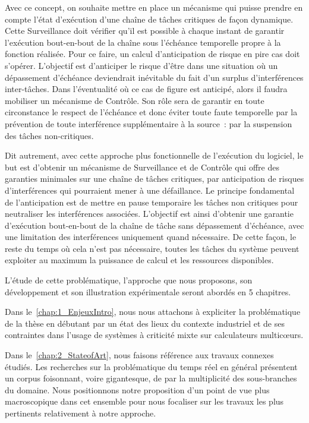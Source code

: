 \documentclass[french, a4paper, 11pt, twoside, pdftex]{StyleThese}
\begin{document}
Avec ce concept, on souhaite mettre en place un mécanisme qui puisse prendre en compte l'état d'exécution d'une chaîne de tâches critiques de façon dynamique. Cette Surveillance doit vérifier qu'il est possible à chaque instant de garantir l'exécution bout-en-bout de la chaîne sous l'échéance temporelle propre à la fonction réalisée. Pour ce faire, un calcul d'anticipation de risque en pire cas doit s'opérer. L'objectif est d'anticiper le risque d'être dans une situation où un dépassement d'échéance deviendrait inévitable du fait d'un surplus d'interférences inter-tâches. Dans l'éventualité où ce cas de figure est anticipé, alors il faudra mobiliser un mécanisme de Contrôle. Son rôle sera de garantir en toute circonstance le respect de l'échéance et donc éviter toute faute temporelle par la prévention de toute interférence supplémentaire à la source~: par la suspension des tâches non-critiques.

Dit autrement, avec cette approche plus fonctionnelle de l'exécution du logiciel, le but est d'obtenir un mécanisme de Surveillance et de Contrôle qui offre des garanties minimales sur une chaîne de tâches critiques, par anticipation de risques d'interférences qui pourraient mener à une défaillance. Le principe fondamental de l'anticipation est de mettre en pause temporaire les tâches non critiques pour neutraliser les interférences associées. L'objectif est ainsi d'obtenir une garantie d'exécution bout-en-bout de la chaîne de tâche sans dépassement d'échéance, avec une limitation des interférences uniquement quand nécessaire. De cette façon, le reste du temps où cela n'est pas nécessaire, toutes les tâches du système peuvent exploiter au maximum la puissance de calcul et les ressources disponibles.

\smallbreak
\smallbreak
L’étude de cette problématique, l’approche que nous proposons, son développement et son
illustration expérimentale seront abordés en 5 chapitres.

Dans le~\autoref{chap:1_EnjeuxIntro}, nous nous attachons à expliciter la problématique de la thèse en débutant par un état des lieux du contexte industriel et de ses contraintes dans l'usage de systèmes à criticité mixte sur calculateurs multicœurs.

Dans le~\autoref{chap:2_StateofArt}, nous faisons référence aux travaux connexes étudiés. Les recherches sur la problématique du temps réel en général présentent un corpus foisonnant, voire gigantesque, de par la multiplicité des sous-branches du domaine. Nous positionnons notre proposition d'un point de vue plus macroscopique dans cet ensemble pour nous focaliser sur les travaux les plus pertinents relativement à notre approche.
\end{document}
